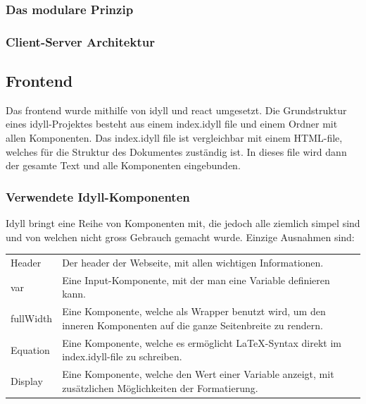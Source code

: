 \documentclass[a4paper,10.2pt,pdftex]{scrartcl}%
\begin{document}
\subsubsection{Das modulare Prinzip}  
\subsubsection{Client-Server Architektur}

\subsection{Frontend}
Das frontend wurde mithilfe von idyll und react umgesetzt. Die Grundstruktur eines idyll-Projektes besteht aus einem index.idyll file und einem Ordner mit allen Komponenten. Das index.idyll file ist vergleichbar mit einem HTML-file, welches für die Struktur des Dokumentes zuständig ist. In dieses file wird dann der gesamte Text und alle Komponenten eingebunden.
\subsubsection{Verwendete Idyll-Komponenten}
Idyll bringt eine Reihe von Komponenten mit, die jedoch alle ziemlich simpel sind und von welchen nicht gross Gebrauch gemacht wurde. Einzige Ausnahmen sind:

\begin{tabularx}{\textwidth}{p{2.5cm}p{11cm}}
Header & Der header der Webseite, mit allen wichtigen Informationen.\\
var & Eine Input-Komponente, mit der man eine Variable definieren kann. \\
fullWidth & Eine Komponente, welche als Wrapper benutzt wird, um den inneren Komponenten auf die ganze Seitenbreite zu rendern. \\
Equation & Eine Komponente, welche es ermöglicht LaTeX-Syntax direkt im index.idyll-file zu schreiben. \\
Display & Eine Komponente, welche den Wert einer Variable anzeigt, mit zusätzlichen Möglichkeiten der Formatierung.
\end{tabularx}
\end{document}
